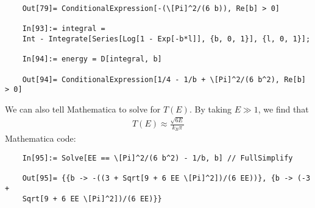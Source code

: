 \documentclass{article}
\theoremstyle{definition}
\newcommand{\f}[2]{\frac{#1}{#2}}
\begin{document}
\begin{enumerate}[label=(\alph*)]
\begin{lstlisting}
	Out[79]= ConditionalExpression[-(\[Pi]^2/(6 b)), Re[b] > 0]
	
	In[93]:= integral = 
	Int - Integrate[Series[Log[1 - Exp[-b*l]], {b, 0, 1}], {l, 0, 1}];
	
	In[94]:= energy = D[integral, b]
	
	Out[94]= ConditionalExpression[1/4 - 1/b + \[Pi]^2/(6 b^2), Re[b] > 0]
	\end{lstlisting}
	
	We can also tell Mathematica to solve for $T(E)$. By taking $E \gg 1$, we find that
	\begin{align*}
	\boxed{T(E) \approx \f{\sqrt{{6E}}}{k_B \pi} }
	\end{align*}
	Mathematica code:
	\begin{lstlisting}
	In[95]:= Solve[EE == \[Pi]^2/(6 b^2) - 1/b, b] // FullSimplify
	
	Out[95]= {{b -> -((3 + Sqrt[9 + 6 EE \[Pi]^2])/(6 EE))}, {b -> (-3 + 
	Sqrt[9 + 6 EE \[Pi]^2])/(6 EE)}}
	\end{lstlisting}
	

\end{enumerate}
\end{document}
